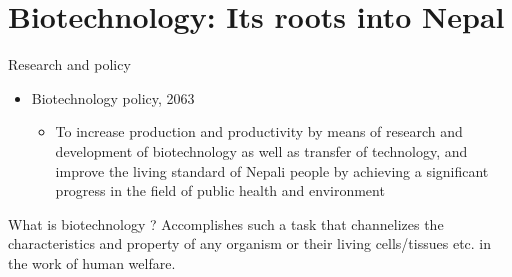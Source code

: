 \documentclass[
  ignorenonframetext,
  aspectratio=169]{beamer}
\providecommand{\tightlist}{%
  \setlength{\itemsep}{0pt}\setlength{\parskip}{0pt}}
\begin{document}
\hypertarget{biotechnology-its-roots-into-nepal}{%
\section{Biotechnology: Its roots into
Nepal}\label{biotechnology-its-roots-into-nepal}}

\begin{frame}{Research and policy}
\protect\hypertarget{research-and-policy}{}
\begin{itemize}
\tightlist
\item
  Biotechnology policy, 2063

  \begin{itemize}
  \tightlist
  \item
    To increase production and productivity by means of research and
    development of biotechnology as well as transfer of technology, and
    improve the living standard of Nepali people by achieving a
    significant progress in the field of public health and environment
  \end{itemize}
\end{itemize}

\begin{block}{What is biotechnology ?}
\protect\hypertarget{what-is-biotechnology}{}
Accomplishes such a task that channelizes the characteristics and
property of any organism or their living cells/tissues etc. in the work
of human welfare.
\end{block}
\end{frame}
\end{document}
